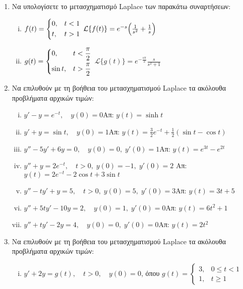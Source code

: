 \begin{enumerate}
  \item Να υπολογίσετε το μετασχηματισμό Laplace των παρακάτω συναρτήσεων:

    \begin{enumerate}[i)]
      \item $f(t)=\begin{dcases} 0, & t<1 \\ t, & t>1 \end{dcases}$ \hfill 
        $\mathcal{L}\{f(t)\}=e^{-s}\Bigl(\frac{1}{s^2}+\frac{1}{s}\Bigr)$
      \item $g(t)=\begin{dcases} 0, & t<\frac{\pi}{2} \\ \sin t, & t>\frac{\pi}{2} 
        \end{dcases}$ \hfill $\mathcal{L}\{g(t)\}=e^{-\frac{s\pi}{2}}\frac{s}{s^2+1}$
    \end{enumerate}

  \item Να επιλυθούν με τη βοήθεια του μετασχηματισμού Laplace τα ακόλουθα προβλήματα 
    αρχικών τιμών:

    \begin{enumerate}[i)]
      \item $y'-y=e^{-t},\quad y(0)=0$\hfill Απ: $y(t)=\sinh t$
      \item $y'+y=\sin t,\quad y(0)=1$\hfill Απ: $y(t)=\frac{3}{2}e^{-t}+
        \frac{1}{2}(\sin t-\cos t)$
      \item $y''-5y'+6y=0,\quad y(0)=0, \; y'(0)=1$\hfill Απ: $y(t)=e^{3t}-e^{2t}$
      \item $y''+y=2e^{-t},\quad t>0,\; y(0)=-1,\; y'(0)=2$
        \hfill Απ: $y(t)=2e^{-t}-2\cos t+3 \sin t$
      \item $y''-ty'+y=5, \quad t>0,\; y(0)=5,\; y'(0)=3$\hfill Απ: $y(t)=3t+5$
      \item $y'' +5ty'-10y=2, \quad y(0)=1,\; y'(0)=0$\hfill Απ: $y(t)=6t^2+1$
      \item $y'' +ty'-2y=4, \quad y(0)=0,\; y'(0)=0$\hfill Απ: $y(t)=2t^2$
    \end{enumerate}

  \item Να επιλυθούν με τη βοήθεια του μετασχηματισμού Laplace τα ακόλουθα προβλήματα 
    αρχικών τιμών:

    \begin{enumerate}[i)]
      \item $y'+2y=g(t),\quad t>0,\quad y(0)=0$, όπου $g(t)=\begin{cases}3, & 
          0\leq t<1 \\ 1, & t\geq 1\end{cases}$


\end{enumerate}
\end{enumerate}
